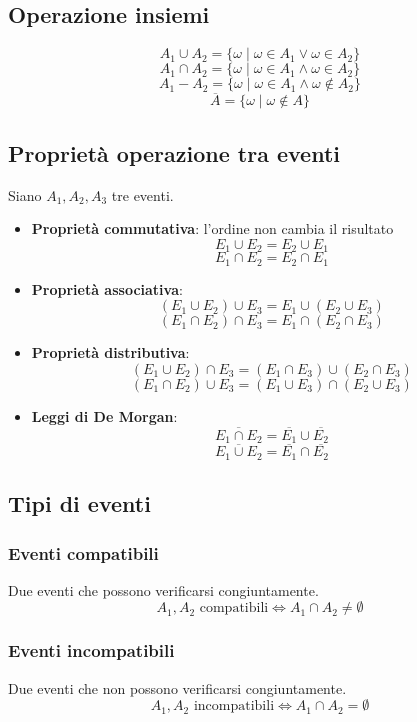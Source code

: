 \documentclass{article}  %
\theoremstyle{definition}
\begin{document}
\subsection{Operazione insiemi}
\[
	A_1 \cup A_2 = \{\omega \mid \omega \in A_1 \lor \omega \in A_2\}
\]
\[
	A_1 \cap A_2 = \{\omega \mid \omega \in A_1 \land \omega \in A_2\}
\]
\[
	A_1 - A_2 = \{\omega \mid \omega \in A_1 \land \omega \notin A_2\}
\]
\[
	\overline{A} = \{\omega \mid \omega \notin A\}
\]
\subsection{Proprietà operazione tra eventi}
Siano $A_1,A_2,A_3$ tre eventi.
\begin{itemize}
	\item \textbf{Proprietà commutativa}: l'ordine non cambia il risultato
	      \[
		      E_1 \cup E_2 = E_2 \cup E_1
	      \]
	      \[
		      E_1 \cap E_2 = E_2 \cap E_1
	      \]
	\item \textbf{Proprietà associativa}:
	      \[
		      (E_1 \cup E_2) \cup E_3 = E_1 \cup (E_2 \cup E_3)
	      \]
	      \[
		      (E_1 \cap E_2) \cap E_3 = E_1 \cap (E_2 \cap E_3)
	      \]
	\item \textbf{Proprietà distributiva}:
	      \[
		      (E_1 \cup E_2) \cap E_3 = (E_1 \cap E_3) \cup (E_2 \cap E_3)
	      \]
	      \[
		      (E_1 \cap E_2) \cup E_3 = (E_1 \cup E_3) \cap (E_2 \cup E_3)
	      \]
	\item \textbf{Leggi di De Morgan}:
	      \[
		      \overline{E_1 \cap E_2}=\overline{E_1} \cup \overline{E_2}
	      \]
	      \[
		      \overline{E_1 \cup E_2}=\overline{E_1} \cap \overline{E_2}
	      \]
\end{itemize}
\subsection{Tipi di eventi}
\subsubsection{Eventi compatibili}
Due eventi che possono verificarsi congiuntamente.
\[
	A_1,A_2 \text{ compatibili} \iff A_1 \cap A_2 \neq \emptyset
\]
\subsubsection{Eventi incompatibili}
Due eventi che non possono verificarsi congiuntamente.
\[
	A_1,A_2 \text{ incompatibili} \iff A_1 \cap A_2 = \emptyset
\]
\end{document}
